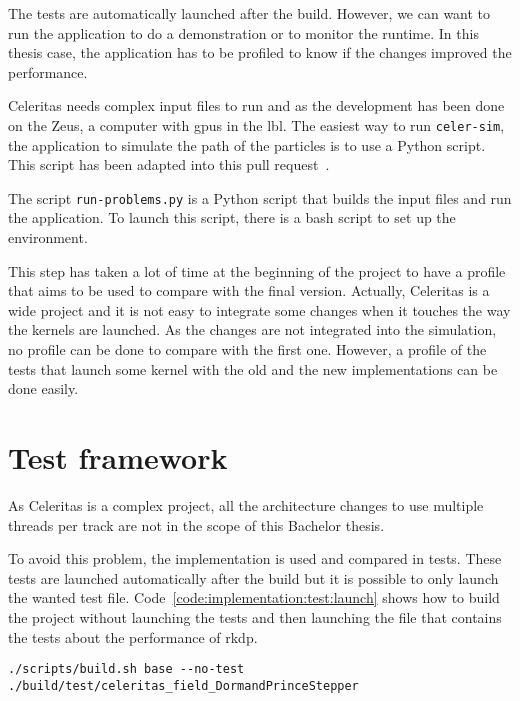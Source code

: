 The tests are automatically launched after the build.
However, we can want to run the application to do a demonstration or to
monitor the runtime.
In this thesis case, the application has to be profiled to know if the changes
improved the performance.

Celeritas needs complex input files to run and as the development has been done
on the Zeus, a computer with \acrshort{gpu}s in the \acrshort{lbl}.
The easiest way to run \texttt{celer-sim}, the application to simulate the
path of the particles is to use a Python script.
This script has been adapted into this pull request~\cite{regression-pull-request}.

The script \texttt{run-problems.py} is a Python script that builds the input
files and run the application.
To launch this script, there is a bash script to set up the environment.

This step has taken a lot of time at the beginning of the project to have a
profile that aims to be used to compare with the final version.
Actually, Celeritas is a wide project and it is not easy to integrate some
changes when it touches the way the kernels are launched.
As the changes are not integrated into the simulation, no profile can be done
to compare with the first one.
However, a profile of the tests that launch some kernel with the old and the new
implementations can be done easily.

\section{Test framework}
\label{ch:implementation:test}

As Celeritas is a complex project, all the architecture changes to use multiple
threads per track are not in the scope of this Bachelor thesis.

To avoid this problem, the implementation is used and compared in tests.
These tests are launched automatically after the build but it is possible to
only launch the wanted test file.
Code~\ref{code:implementation:test:launch} shows how to build the project
without launching the tests and then launching the file that contains the tests
about the performance of \acrshort{rkdp}.

\begin{code}
    \label{code:implementation:test:launch}
    \begin{verbatim}
./scripts/build.sh base --no-test
./build/test/celeritas_field_DormandPrinceStepper
    \end{verbatim}
\end{code}

